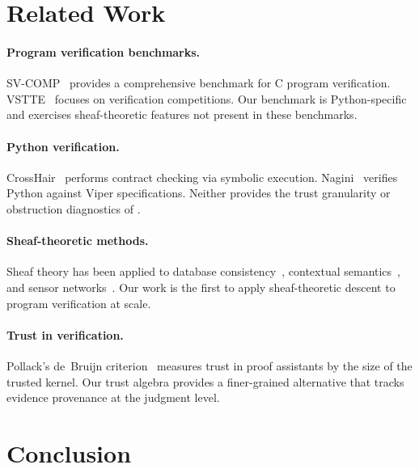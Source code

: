 \documentclass[11pt]{article}
\begin{document}
\section{Related Work}\label{sec:related}

\paragraph{Program verification benchmarks.}
SV-COMP~\cite{svcomp} provides a comprehensive benchmark for C
program verification.  VSTTE~\cite{vstte} focuses on verification
competitions.  Our benchmark is Python-specific and exercises
sheaf-theoretic features not present in these benchmarks.

\paragraph{Python verification.}
CrossHair~\cite{crosshair} performs contract checking via symbolic
execution.  Nagini~\cite{nagini} verifies Python against Viper
specifications.  Neither provides the trust granularity or
obstruction diagnostics of \JuGeo{}.

\paragraph{Sheaf-theoretic methods.}
Sheaf theory has been applied to database
consistency~\cite{goguen-sheaves}, contextual
semantics~\cite{abramsky-sheaves}, and sensor
networks~\cite{robinson-sheaves}.  Our work is the first to
apply sheaf-theoretic descent to program verification at scale.

\paragraph{Trust in verification.}
Pollack's de~Bruijn criterion~\cite{pollack} measures trust in
proof assistants by the size of the trusted kernel.  Our trust
algebra provides a finer-grained alternative that tracks evidence
provenance at the judgment level.

\section{Conclusion}\label{sec:conclusion}
\end{document}
